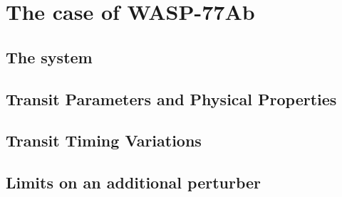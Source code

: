 \chapter{The case of WASP-77Ab}\label{chap:wasp77}

\section{The system}

\section{Transit Parameters and Physical Properties}

\section{Transit Timing Variations}

\section{Limits on an additional perturber}